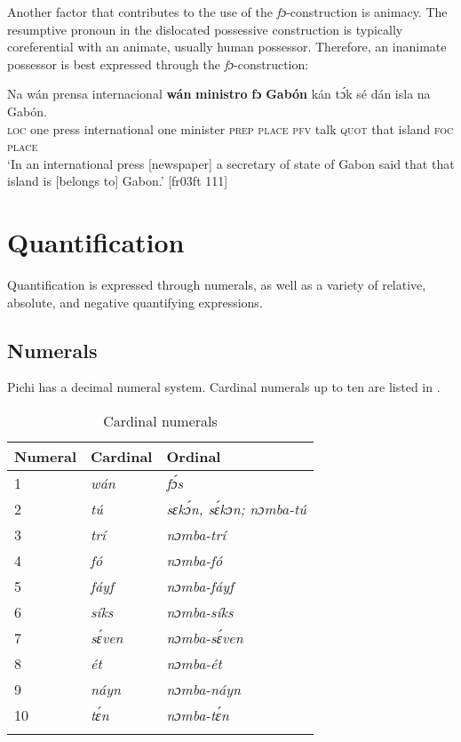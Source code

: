 Another factor that contributes to the use of the \textit{fɔ}-construction is animacy. The resumptive pronoun in the dislocated possessive construction is typically coreferential with an animate, usually human possessor. Therefore, an inanimate possessor is best expressed through the \textit{fɔ}-construction: 


\ea%
    \label{ex:key:249}
    \gll Na  wán  prensa  internacional    \textbf{wán}    \textbf{ministro}  \textbf{fɔ}  \textbf{Gabón}
kán  tɔ́k  sé    dán    isla    na  Gabón.\\
\textsc{loc}  one  press  international    one    minister    \textsc{prep}  \textsc{place}
\textsc{pfv}  talk  \textsc{quot}    that    island  \textsc{foc}  \textsc{place}\\

\glt ‘In an international press [newspaper] a secretary of state of Gabon said that that island is [belongs to] Gabon.’ [fr03ft 111]
\z

\section{Quantification}\label{sec:5.3}

Quantification is expressed through numerals, as well as a variety of relative, absolute, and negative quantifying expressions.

\subsection{Numerals}\label{sec:5.3.1}

Pichi has a decimal numeral system. Cardinal numerals up to ten are listed in .

\begin{table}
\caption{Cardinal numerals}
\label{tab:key:5.4}
\begin{tabularx}{.8\textwidth}{lXX}
\lsptoprule
 Numeral & Cardinal & Ordinal\\
 \midrule 
 1 & \textit{wán} & \textit{fɔ́s}\\
 2 & \textit{tú} & \textit{sɛkɔ́n, sɛ́kɔn; nɔmba-tú}\\
 3 & \textit{trí} & \textit{nɔmba-trí}\\
 4 & \textit{fó} & \textit{nɔmba-fó}\\
 5 & \textit{fáyf} & \textit{nɔmba-fáyf}\\
 6 & \textit{síks} & \textit{nɔmba-síks}\\
 7 & \textit{sɛ́ven} & \textit{nɔmba-sɛ́ven}\\
 8 & \textit{ét} & \textit{nɔmba-ét}\\
 9 & \textit{náyn} & \textit{nɔmba-náyn}\\
 10 & \textit{tɛ́n} & \textit{nɔmba-tɛ́n}\\
\lspbottomrule
\end{tabularx}
\end{table}

